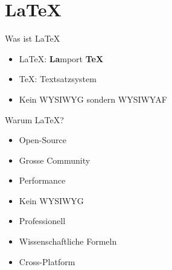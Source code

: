 \section{\LaTeX}

{
\begin{frame}

\end{frame}
}

\begin{frame}{Was ist \LaTeX}
	\begin{itemize}
		\item \LaTeX: \textbf{La}mport \textbf{TeX} \pause
		\item TeX: Textsatzsystem  \pause
		\item Kein WYSIWYG sondern WYSIWYAF
	\end{itemize}
\end{frame}

\begin{frame}{Warum \LaTeX?}
\begin{itemize}
	\item Open-Source  \pause
	\item Grosse Community  \pause
	\item Performance  \pause
	\item Kein WYSIWYG  \pause
	\item Professionell  \pause
	\item Wissenschaftliche Formeln  \pause
	\item Cross-Platform
\end{itemize}
\end{frame}
